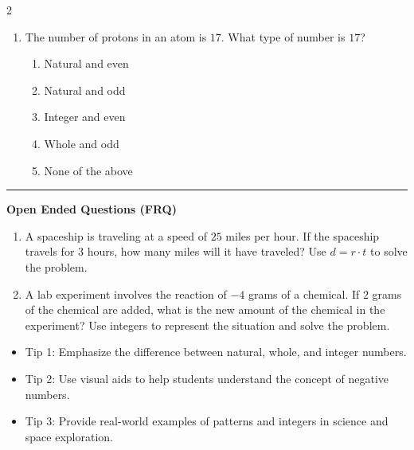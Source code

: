 \documentclass[10pt]{article}
\begin{document}
\begin{multicols}{2}
\begin{enumerate}[label=\textbf{Q\arabic*.}, leftmargin=*, itemsep=6pt, parsep=0pt]
  \item \small The number of protons in an atom is $17$. What type of number is $17$?
  \begin{enumerate}[label=(\Alph*), leftmargin=0.6cm, nosep, itemsep=2pt]
    \item Natural and even
    \item Natural and odd
    \item Integer and even
    \item Whole and odd
    \item None of the above
  \end{enumerate}

\end{enumerate}
\end{multicols}

\vspace{-0.2cm}
\hrule
\vspace{0.2cm}
\textbf{\small Open Ended Questions (FRQ)}
\begin{enumerate}[label=\textbf{Q\arabic*.}, start=9, itemsep=5pt, topsep=0pt]

  \item \small A spaceship is traveling at a speed of $25$ miles per hour. If the spaceship travels for $3$ hours, how many miles will it have traveled? Use $d = r \cdot t$ to solve the problem. \vspace{2cm}

  \item \small A lab experiment involves the reaction of $-4$ grams of a chemical. If $2$ grams of the chemical are added, what is the new amount of the chemical in the experiment? Use integers to represent the situation and solve the problem. \vspace{2cm}

\end{enumerate}

\vfill

\begin{tcolorbox}[colback=blue!5, colframe=mainblue!50, title=\small \textbf{Chef's Tips}, fonttitle=\bfseries, bottom=1mm]
\begin{itemize}[noitemsep, topsep=2pt, leftmargin=0.5cm]
  \item \scriptsize Tip 1: Emphasize the difference between natural, whole, and integer numbers.\item \scriptsize Tip 2: Use visual aids to help students understand the concept of negative numbers.\item \scriptsize Tip 3: Provide real-world examples of patterns and integers in science and space exploration.
\end{itemize}
\end{tcolorbox}
\end{document}
